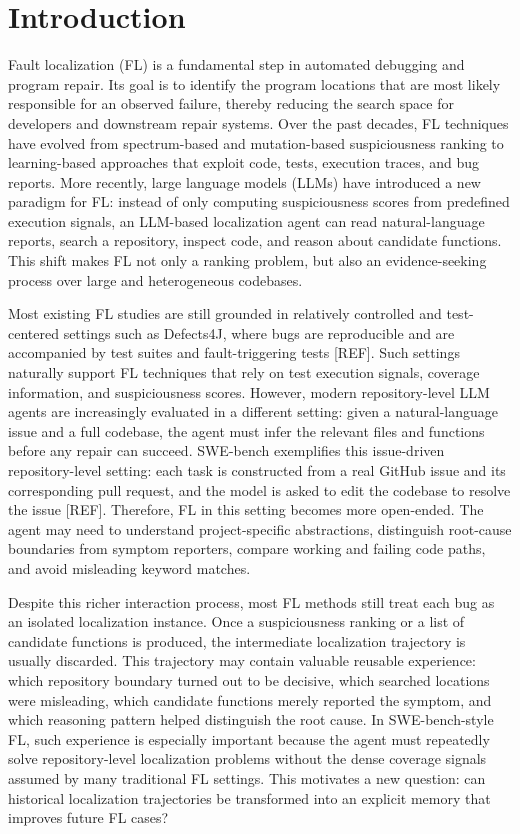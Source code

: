 \section{Introduction}

Fault localization (FL) is a fundamental step in automated debugging and program repair. Its goal is to identify the program locations that are most likely responsible for an observed failure, thereby reducing the search space for developers and downstream repair systems. Over the past decades, FL techniques have evolved from spectrum-based and mutation-based suspiciousness ranking to learning-based approaches that exploit code, tests, execution traces, and bug reports. More recently, large language models (LLMs) have introduced a new paradigm for FL: instead of only computing suspiciousness scores from predefined execution signals, an LLM-based localization agent can read natural-language reports, search a repository, inspect code, and reason about candidate functions. This shift makes FL not only a ranking problem, but also an evidence-seeking process over large and heterogeneous codebases.

Most existing FL studies are still grounded in relatively controlled and test-centered settings such as Defects4J, where bugs are reproducible and are accompanied by test suites and fault-triggering tests [REF]. Such settings naturally support FL techniques that rely on test execution signals, coverage information, and suspiciousness scores. However, modern repository-level LLM agents are increasingly evaluated in a different setting: given a natural-language issue and a full codebase, the agent must infer the relevant files and functions before any repair can succeed. SWE-bench exemplifies this issue-driven repository-level setting: each task is constructed from a real GitHub issue and its corresponding pull request, and the model is asked to edit the codebase to resolve the issue [REF]. Therefore, FL in this setting becomes more open-ended. The agent may need to understand project-specific abstractions, distinguish root-cause boundaries from symptom reporters, compare working and failing code paths, and avoid misleading keyword matches.

Despite this richer interaction process, most FL methods still treat each bug as an isolated localization instance. Once a suspiciousness ranking or a list of candidate functions is produced, the intermediate localization trajectory is usually discarded. This trajectory may contain valuable reusable experience: which repository boundary turned out to be decisive, which searched locations were misleading, which candidate functions merely reported the symptom, and which reasoning pattern helped distinguish the root cause. In SWE-bench-style FL, such experience is especially important because the agent must repeatedly solve repository-level localization problems without the dense coverage signals assumed by many traditional FL settings. This motivates a new question: can historical localization trajectories be transformed into an explicit memory that improves future FL cases?

